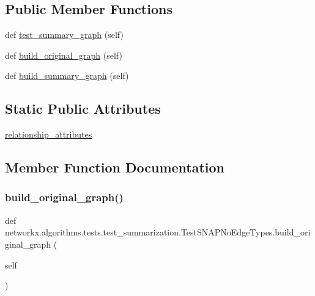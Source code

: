 \subsection*{Public Member Functions}
\begin{DoxyCompactItemize}
\item 
def \hyperlink{classnetworkx_1_1algorithms_1_1tests_1_1test__summarization_1_1TestSNAPNoEdgeTypes_adb0bbc4109512aa3f2fec74bc83c9ed5}{test\+\_\+summary\+\_\+graph} (self)
\item 
def \hyperlink{classnetworkx_1_1algorithms_1_1tests_1_1test__summarization_1_1TestSNAPNoEdgeTypes_a2414c9c09dab50e3b5648779c4261870}{build\+\_\+original\+\_\+graph} (self)
\item 
def \hyperlink{classnetworkx_1_1algorithms_1_1tests_1_1test__summarization_1_1TestSNAPNoEdgeTypes_a275672ac98d2ce394444a0ab82875e79}{build\+\_\+summary\+\_\+graph} (self)
\end{DoxyCompactItemize}
\subsection*{Static Public Attributes}
\begin{DoxyCompactItemize}
\item 
\hyperlink{classnetworkx_1_1algorithms_1_1tests_1_1test__summarization_1_1TestSNAPNoEdgeTypes_a878003d4e6215700ecff7204fb30fd1a}{relationship\+\_\+attributes}
\end{DoxyCompactItemize}


\subsection{Member Function Documentation}
\mbox{\label{classnetworkx_1_1algorithms_1_1tests_1_1test__summarization_1_1TestSNAPNoEdgeTypes_a2414c9c09dab50e3b5648779c4261870}} 
\subsubsection{\texorpdfstring{build\+\_\+original\+\_\+graph()}{build\_original\_graph()}}
{\footnotesize\ttfamily def networkx.\+algorithms.\+tests.\+test\+\_\+summarization.\+Test\+S\+N\+A\+P\+No\+Edge\+Types.\+build\+\_\+original\+\_\+graph (\begin{DoxyParamCaption}\item[{}]{self }\end{DoxyParamCaption})}

